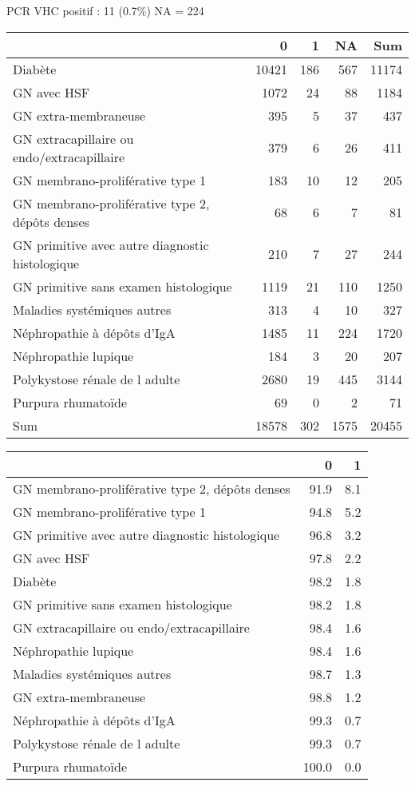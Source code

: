 \documentclass[11pt,a4paper]{article}\usepackage[]{graphicx}\usepackage[]{color}
\begin{document}
PCR VHC positif : 11 (0.7\%) NA = 224
\begin{table}[H]
\centering
\begin{tabular}{lrrrr}
  \hline
 & 0 & 1 & NA & Sum \\ 
  \hline
Diabète & 10421 & 186 & 567 & 11174 \\ 
  GN avec HSF & 1072 & 24 & 88 & 1184 \\ 
  GN extra-membraneuse & 395 & 5 & 37 & 437 \\ 
  GN extracapillaire ou endo/extracapillaire & 379 & 6 & 26 & 411 \\ 
  GN membrano-proliférative type 1 & 183 & 10 & 12 & 205 \\ 
  GN membrano-proliférative type 2, dépôts denses & 68 & 6 & 7 & 81 \\ 
  GN primitive avec autre diagnostic histologique & 210 & 7 & 27 & 244 \\ 
  GN primitive sans examen histologique & 1119 & 21 & 110 & 1250 \\ 
  Maladies systémiques autres & 313 & 4 & 10 & 327 \\ 
  Néphropathie à dépôts d'IgA & 1485 & 11 & 224 & 1720 \\ 
  Néphropathie lupique & 184 & 3 & 20 & 207 \\ 
  Polykystose rénale de l adulte & 2680 & 19 & 445 & 3144 \\ 
  Purpura rhumatoïde & 69 & 0 & 2 & 71 \\ 
  Sum & 18578 & 302 & 1575 & 20455 \\ 
   \hline
\end{tabular}
\end{table}
\begin{table}[H]
\centering
\begin{tabular}{lrr}
  \hline
 & 0 & 1 \\ 
  \hline
GN membrano-proliférative type 2, dépôts denses & 91.9 & 8.1 \\ 
  GN membrano-proliférative type 1 & 94.8 & 5.2 \\ 
  GN primitive avec autre diagnostic histologique & 96.8 & 3.2 \\ 
  GN avec HSF & 97.8 & 2.2 \\ 
  Diabète & 98.2 & 1.8 \\ 
  GN primitive sans examen histologique & 98.2 & 1.8 \\ 
  GN extracapillaire ou endo/extracapillaire & 98.4 & 1.6 \\ 
  Néphropathie lupique & 98.4 & 1.6 \\ 
  Maladies systémiques autres & 98.7 & 1.3 \\ 
  GN extra-membraneuse & 98.8 & 1.2 \\ 
  Néphropathie à dépôts d'IgA & 99.3 & 0.7 \\ 
  Polykystose rénale de l adulte & 99.3 & 0.7 \\ 
  Purpura rhumatoïde & 100.0 & 0.0 \\ 
   \hline
\end{tabular}
\end{table}
\end{document}

